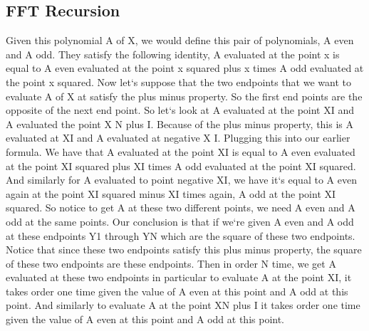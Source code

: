 \subsection{FFT  Recursion}
Given this polynomial A of X, we would define this pair of polynomials, A even and A odd.
They satisfy the following identity, A evaluated at the point x is equal to A even evaluated at the point x squared plus x times A odd evaluated at the point x squared.
Now let`s suppose that the two endpoints that we want to evaluate A of X at satisfy the plus minus property.
So the first end points are the opposite of the next end point.
So let`s look at A evaluated at the point XI and A evaluated the point X N plus I\@.
Because of the plus minus property, this is A evaluated at XI and A evaluated at negative X I\@.
Plugging this into our earlier formula.
We have that A evaluated at the point XI is equal to A even evaluated at the point XI squared plus XI times A odd evaluated at the point XI squared.
And similarly for A evaluated to point negative XI, we have it`s equal to A even again at the point XI squared minus XI times again, A odd at the point XI squared.
So notice to get A at these two different points, we need A even and A odd at the same points.
Our conclusion is that if we`re given A even and A odd at these endpoints Y1 through YN which are the square of these two endpoints.
Notice that since these two endpoints satisfy this plus minus property, the square of these two endpoints are these endpoints.
Then in order N time, we get A evaluated at these two endpoints in particular to evaluate A at the point XI, it takes order one time given the value of A even at this point and A odd at this point.
And similarly to evaluate A at the point XN plus I it takes order one time given the value of A even at this point and A odd at this point.

